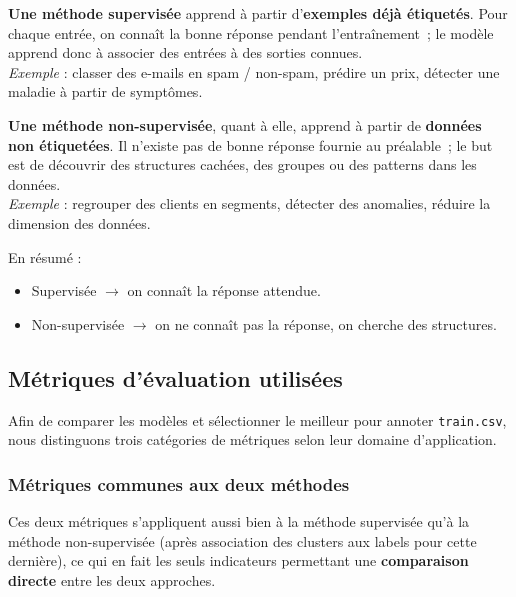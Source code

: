 \documentclass[12pt,a4paper]{report}
\begin{document}
\textbf{Une méthode supervisée} apprend à partir d'\textbf{exemples déjà étiquetés}. Pour chaque entrée, on connaît la bonne réponse pendant l'entraînement~; le modèle apprend donc à associer des entrées à des sorties connues.\\
\textit{Exemple} : classer des e-mails en spam / non-spam, prédire un prix, détecter une maladie à partir de symptômes.

\textbf{Une méthode non-supervisée}, quant à elle, apprend à partir de \textbf{données non étiquetées}. Il n'existe pas de bonne réponse fournie au préalable~; le but est de découvrir des structures cachées, des groupes ou des patterns dans les données.\\
\textit{Exemple} : regrouper des clients en segments, détecter des anomalies, réduire la dimension des données.

En résumé :
\begin{itemize}
  \item Supervisée $\rightarrow$ on connaît la réponse attendue.
  \item Non-supervisée $\rightarrow$ on ne connaît pas la réponse, on cherche des structures.
\end{itemize}

\subsection{Métriques d'évaluation utilisées}

Afin de comparer les modèles et sélectionner le meilleur pour annoter \texttt{train.csv}, nous distinguons trois catégories de métriques selon leur domaine d'application.

\subsubsection{Métriques communes aux deux méthodes}

Ces deux métriques s'appliquent aussi bien à la méthode supervisée qu'à la méthode non-supervisée (après association des clusters aux labels pour cette dernière), ce qui en fait les seuls indicateurs permettant une \textbf{comparaison directe} entre les deux approches.
\end{document}
